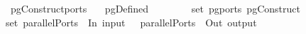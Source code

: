 \isamarkupfalse%
\ pgConstruct{\isacharunderscore}ports{\isacharcolon}\isanewline
\ \ \ {\isachardoublequoteopen}pgDefined\ \isanewline
\ \ \ \ \ \ \ {\isachardoublequoteopen}set\ {\isacharparenleft}pg{\isacharunderscore}ports\ {\isacharparenleft}pgConstruct\ \ {\isacharequal}\isanewline
{}set\ {\isacharparenleft}parallelPorts\ {}\ In\ {\isacharparenleft}input\ \ {\isacharat}\ parallelPorts\ {}\ Out\ {\isacharparenleft}output\ 
